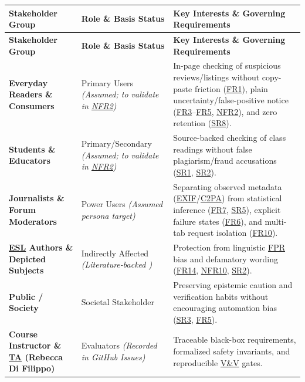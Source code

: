 \documentclass[11pt]{article}
\newcommand{\CTwoPA}{\hyperlink{acr-c2pa}{C2PA}}
\newcommand{\ESL}{\hyperlink{acr-esl}{ESL}}
\newcommand{\EXIF}{\hyperlink{acr-exif}{EXIF}}
\newcommand{\FPR}{\hyperlink{acr-fpr}{FPR}}
\newcommand{\VnV}{\hyperlink{acr-vnv}{V\&V}}
\newcommand{\TA}{\hyperlink{acr-ta}{TA}}
\begin{document}
{\small
\begin{tabularx}{\textwidth}{P{3.0cm} P{3.0cm} Y}
\caption{Stakeholders and Verification Status of Elicitation Basis} \label{TblStakeholders}\\
\toprule
\textbf{Stakeholder Group} & \textbf{Role \& Basis Status} & \textbf{Key Interests \& Governing Requirements}\\
\midrule
\endfirsthead
\toprule
\textbf{Stakeholder Group} & \textbf{Role \& Basis Status} & \textbf{Key Interests \& Governing Requirements}\\
\midrule
\endhead
\bottomrule
\endfoot
\textbf{Everyday Readers \& Consumers} & Primary Users \emph{(Assumed; to validate in \hyperref[NFR2]{NFR2})} & In-page checking of suspicious reviews/listings without copy-paste friction (\hyperref[FR1]{FR1}), plain uncertainty/false-positive notice (\hyperref[FR3]{FR3}--\hyperref[FR5]{FR5}, \hyperref[NFR2]{NFR2}), and zero retention (\hyperref[SR8]{SR8}).\\
\midrule
\textbf{Students \& Educators} & Primary/Secondary \emph{(Assumed; to validate in \hyperref[NFR2]{NFR2})} & Source-backed checking of class readings without false plagiarism/fraud accusations (\hyperref[SR1]{SR1}, \hyperref[SR2]{SR2}).\\
\midrule
\textbf{Journalists \& Forum Moderators} & Power Users \emph{(Assumed persona target)} & Separating observed metadata (\EXIF{}/\CTwoPA{}) from statistical inference (\hyperref[FR7]{FR7}, \hyperref[SR5]{SR5}), explicit failure states (\hyperref[FR6]{FR6}), and multi-tab request isolation (\hyperref[FR10]{FR10}).\\
\midrule
\textbf{\ESL{} Authors \& Depicted Subjects} & Indirectly Affected \emph{(Literature-backed \cite{Liang2023ESL})} & Protection from linguistic \FPR{} bias and defamatory wording (\hyperref[FR14]{FR14}, \hyperref[NFR10]{NFR10}, \hyperref[SR2]{SR2}).\\
\midrule
\textbf{Public / Society} & Societal Stakeholder & Preserving epistemic caution and verification habits without encouraging automation bias (\hyperref[SR3]{SR3}, \hyperref[FR5]{FR5}).\\
\midrule
\textbf{Course Instructor \& \TA{} (Rebecca Di Filippo)} & Evaluators \emph{(Recorded in GitHub Issues)} & Traceable black-box requirements, formalized safety invariants, and reproducible \VnV{} gates.\\
\end{tabularx}
}
\end{document}
